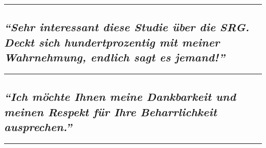 \begin{center}\rule{0.5\linewidth}{\linethickness}\end{center}

\hypertarget{sehr-interessant-diese-studie-uxfcber-die-srg-deckt-sich-hundertprozentig-mit-meiner-wahrnehmung-endlich-sagt-es-jemand}{%
\subsection{\texorpdfstring{\emph{``Sehr interessant diese Studie über
die SRG. Deckt sich hundertprozentig mit meiner Wahrnehmung, endlich
sagt es
jemand!''}}{``Sehr interessant diese Studie über die SRG. Deckt sich hundertprozentig mit meiner Wahrnehmung, endlich sagt es jemand!''}}\label{sehr-interessant-diese-studie-uxfcber-die-srg-deckt-sich-hundertprozentig-mit-meiner-wahrnehmung-endlich-sagt-es-jemand}}

\begin{center}\rule{0.5\linewidth}{\linethickness}\end{center}

\hypertarget{ich-muxf6chte-ihnen-meine-dankbarkeit-und-meinen-respekt-fuxfcr-ihre-beharrlichkeit-ausprechen}{%
\subsection{\texorpdfstring{\emph{``Ich möchte Ihnen meine Dankbarkeit
und meinen Respekt für Ihre Beharrlichkeit
ausprechen.''}}{``Ich möchte Ihnen meine Dankbarkeit und meinen Respekt für Ihre Beharrlichkeit ausprechen.''}}\label{ich-muxf6chte-ihnen-meine-dankbarkeit-und-meinen-respekt-fuxfcr-ihre-beharrlichkeit-ausprechen}}

\begin{center}\rule{0.5\linewidth}{\linethickness}\end{center}

